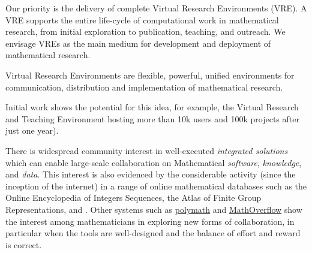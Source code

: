 


\begin{center}
  \begin{boxedminipage}{.95\textwidth}\em

    Our priority is the delivery of complete Virtual Research
    Environments (VRE). A VRE supports the entire life-cycle of
    computational work in mathematical research, from initial
    exploration to publication, teaching, and outreach. We envisage
    VREs as the main medium for development and deployment of
    mathematical research.
  \end{boxedminipage}
\end{center}

Virtual Research Environments are flexible, powerful, unified
environments for communication, distribution and implementation of
mathematical research.

Initial work shows the potential for this idea, for example, the
Virtual Research and Teaching Environment \SMC hosting more than 10k
users and 100k projects after just one year).  

There is widespread community interest in well-executed
\emph{integrated solutions} which can enable large-scale collaboration
on Mathematical \emph{software}, \emph{knowledge}, and
\emph{data}. This interest is also evidenced by the considerable
activity (since the inception of the internet) in a range of online
mathematical databases such as the Online Encyclopedia of Integers
Sequences, the Atlas of Finite Group Representations, and \LMFDB.
%
Other systems such as \href{http://polymathprojects.org/}{polymath}
and \href{mathoverflow.net}{MathOverflow} show the interest among
mathematicians in exploring new forms of collaboration, in particular
when the tools are well-designed and the balance of effort and reward
is correct.


